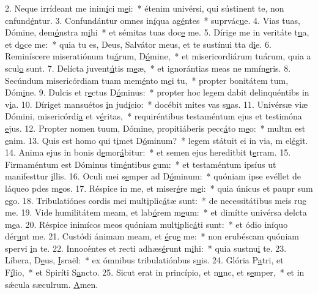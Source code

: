 2. Neque irrídeant me inim\uline{í}ci m\uline{e}i:~* étenim univérsi, qui sústinent te, non cnfund\uline{é}ntur.
3. Confundántur omnes in\uline{í}qua ag\uline{é}ntes~* suprvác\uline{u}e.
4. Vias tuas, Dómine, dem\uline{ó}nstra m\uline{i}hi~* et sémitas tuas doc\uline{e} me.
5. Dírige me in veritáte t\uline{u}a, et d\uline{o}ce me:~* quia tu es, Deus, Salvátor meus, et te sustínui tta d\uline{i}e.
6. Reminíscere miseratiónum tu\uline{á}rum, D\uline{ó}mine,~* et misericordiárum tuárum, quia a scul\uline{o} sunt.
7. Delícta juvent\uline{ú}tis m\uline{e}æ,~* et ignorántias meas ne mmín\uline{e}ris.
8. Secúndum misericórdiam tuam mem\uline{é}nto m\uline{e}i tu,~* propter bonitátem tum, Dóm\uline{i}ne.
9. Dulcis et r\uline{e}ctus D\uline{ó}minus:~* propter hoc legem dabit delinquéntibs in v\uline{i}a.
10. Díriget mansuétos \uline{i}n jud\uline{í}cio:~* docébit mites vas s\uline{u}as.
11. Univérsæ viæ Dómini, misericórdi\uline{a} et v\uline{é}ritas,~* requiréntibus testaméntum ejus et testimóna \uline{e}jus.
12. Propter nomen tuum, Dómine, propitiáberis pecc\uline{á}to m\uline{e}o:~* multm est \uline{e}nim.
13. Quis est homo qui t\uline{i}met D\uline{ó}minum?~* legem státuit ei in via, m el\uline{é}git.
14. Anima ejus in bonis d\uline{e}mor\uline{á}bitur:~* et semen ejus hereditbit t\uline{e}rram.
15. Firmaméntum est Dóminus tim\uline{é}ntibus \uline{e}um:~* et testaméntum ipsíus ut manifesttur \uline{i}llis.
16. Oculi mei s\uline{e}mper ad D\uline{ó}minum:~* quóniam ipse evéllet de láqueo pdes m\uline{e}os.
17. Réspice in me, et miser\uline{é}re m\uline{e}i:~* quia únicus et paupr sum \uline{e}go.
18. Tribulatiónes cordis mei mult\uline{i}plic\uline{á}tæ sunt:~* de necessitátibus meis ru\uline{e} me.
19. Vide humilitátem meam, et lab\uline{ó}rem m\uline{e}um:~* et dimítte univérsa delcta m\uline{e}a.
20. Réspice inimícos meos quóniam mult\uline{i}plic\uline{á}ti sunt:~* et ódio iníquo dér\uline{u}nt me.
21. Custódi ánimam meam, et \uline{é}ru\uline{e} me:~* non erubéscam quóniam spervi \uline{i}n te.
22. Innocéntes et recti adhæs\uline{é}runt m\uline{i}hi:~* quia sustnu\uline{i} te.
23. Líbera, D\uline{e}us, \uline{I}sraël:~* ex ómnibus tribulatiónbus s\uline{u}is.
24. Glória P\uline{a}tri, et F\uline{í}lio,~* et Spiríti S\uline{a}ncto.
25. Sicut erat in princípio, et n\uline{u}nc, et s\uline{e}mper,~* et in sǽcula sæculrum. \uline{A}men.

